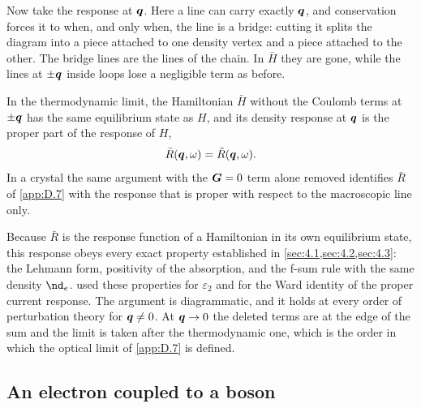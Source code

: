 Now take the response at $\bm{q}$. Here a line can carry exactly $\bm{q}$, and conservation forces it to when, and only when, the line is a bridge: cutting it splits the diagram into a piece attached to one density vertex and a piece attached to the other. The bridge lines are the lines of the chain. In $\bar H$ they are gone, while the lines at $\pm\bm{q}$ inside loops lose a negligible term as before.
\begin{keyresult}
In the thermodynamic limit, the Hamiltonian $\bar H$ without the Coulomb terms at $\pm\bm{q}$ has the same equilibrium state as $H$, and its density response at $\bm{q}$ is the proper part of the response of $H$,
\begin{equation}
  \bar R(\bm{q},\omega) = \tilde R(\bm{q},\omega) .
  \label{eq:4.8-removal}
\end{equation}
In a crystal the same argument with the $\bm{G} = 0$ term alone removed identifies $\bar R$ of \cref{app:D.7} with the response that is proper with respect to the macroscopic line only.
\end{keyresult}
Because $\bar R$ is the response function of a Hamiltonian in its own equilibrium state, this response obeys every exact property established in \cref{sec:4.1,sec:4.2,sec:4.3}: the Lehmann form, positivity of the absorption, and the f-sum rule with the same density $\nd_e$.  used these properties for $\varepsilon_2$ and for the Ward identity of the proper current response. The argument is diagrammatic, and it holds at every order of perturbation theory for $\bm{q} \ne 0$. At $\bm{q} \to 0$ the deleted terms are at the edge of the sum and the limit is taken after the thermodynamic one, which is the order in which the optical limit of \cref{app:D.7} is defined.

\subsection{An electron coupled to a boson}

